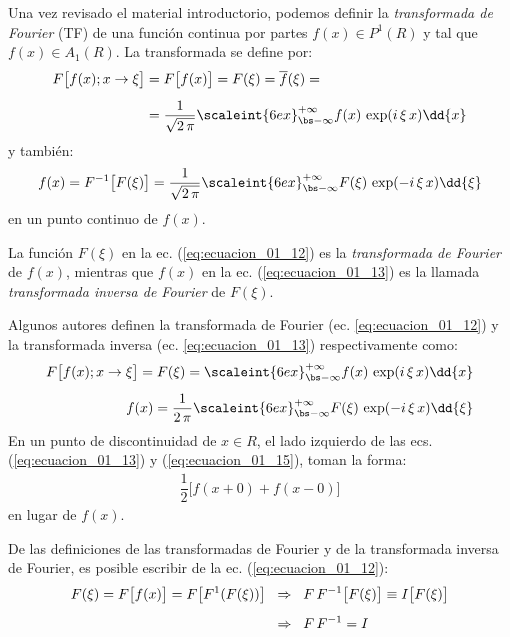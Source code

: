 Una vez revisado el material introductorio, podemos definir la \emph{transformada de Fourier} (TF) de una función continua por partes $f (x) \in P^{1} (R)$ y tal que $f (x) \in A_{1} (R)$. La transformada se define por:
\begin{align}
\begin{aligned}[b]
F \big[ f (x); x \to \xi \big] &= F \big[ f (x) \big] = F (\xi) = \overline{f} (\xi) = \\[0.5em] 
&= \dfrac{1}{\sqrt{2 \, \pi}} \scaleint{6ex}_{\bs -\infty}^{+\infty} f (x) \, \exp(i \, \xi \, x) \dd{x}
\end{aligned}
\label{eq:ecuacion_01_12}
\end{align}
y también:
\begin{align}
f (x) = F^{-1} \big[ F (\xi) \big] = \dfrac{1}{\sqrt{2 \, \pi}} \scaleint{6ex}_{\bs -\infty}^{+\infty} F (\xi) \, \exp(-i \, \xi \, x) \dd{\xi}
\label{eq:ecuacion_01_13}
\end{align}
en un punto continuo de $f (x)$.
\par
La función $F (\xi)$ en la ec. (\ref{eq:ecuacion_01_12}) es la \emph{transformada de Fourier} de $f (x)$, mientras que $f (x)$ en la ec. (\ref{eq:ecuacion_01_13}) es la llamada \emph{transformada inversa de Fourier} de $F (\xi)$.
\par
Algunos autores definen la transformada de Fourier  (ec. \ref{eq:ecuacion_01_12}) y la transformada inversa (ec. \ref{eq:ecuacion_01_13}) respectivamente como:
\begin{align}
F \big[ f (x); x \to \xi \big] = F (\xi) = \scaleint{6ex}_{\bs -\infty}^{+\infty} f (x) \, \exp(i \, \xi \, x) \dd{x} \label{eq:ecuacion_01_14} \\[0.5em]
f (x) = \dfrac{1}{2 \, \pi} \scaleint{6ex}_{\bs -\infty}^{+\infty} F (\xi) \, \exp(-i \, \xi \, x) \dd{\xi}
\label{eq:ecuacion_01_15}
\end{align}
En un punto de discontinuidad de $x \in R$, el lado izquierdo de las ecs. (\ref{eq:ecuacion_01_13}) y (\ref{eq:ecuacion_01_15}), toman la forma:
\begin{align*}
\dfrac{1}{2} \big[ f(x + 0) + f(x - 0) \big]
\end{align*}
en lugar de $f (x)$.
\par
De las definiciones de las transformadas de Fourier y de la transformada inversa de Fourier, es posible escribir de la ec. (\ref{eq:ecuacion_01_12}):
\begin{align*}
F (\xi) = F \big[ f (x) \big] = F \big[ F^{1} (F (\xi)) \big] \hspace{0.2cm} &\Rightarrow \hspace{0.2cm} F \, F^{-1} \big[ F (\xi) \big] \equiv I \big[ F (\xi) \big] \\[0.5em]
&\Rightarrow \hspace{0.2cm} F \, F^{-1} = I
\end{align*}
